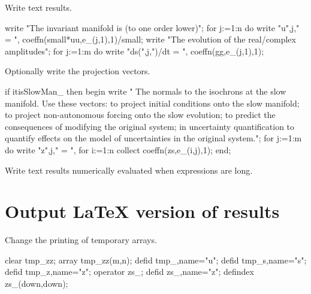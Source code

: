 \documentclass[11pt,a5paper]{article}
\begin{document}
Write text results.
\begin{reduce}
write "The invariant manifold is (to one order lower)";
for j:=1:n do write "u",j," = ",
  coeffn(small*uu,e_(j,1),1)/small;
write "The evolution of the real/complex amplitudes";
for j:=1:m do write "ds(",j,")/dt = ",
  coeffn(gg,e_(j,1),1);
\end{reduce}

Optionally write the projection vectors.
\begin{reduce}
if itisSlowMan_ then begin write "
The normals to the isochrons at the slow manifold.
Use these vectors: to project initial conditions
onto the slow manifold; to project non-autonomous
forcing onto the slow evolution; to predict the
consequences of modifying the original system; in
uncertainty quantification to quantify effects on
the model of uncertainties in the original system.";
  for j:=1:m do write "z",j," = ",
    for i:=1:n collect coeffn(zs,e_(i,j),1);
end;
\end{reduce}

Write text results numerically evaluated when expressions
are long.





\section{Output LaTeX version of results}
Change the printing of temporary arrays.
\begin{reduce}
clear tmp_zz; array tmp_zz(m,n);
defid tmp_,name="u";
defid tmp_s,name="\dot s";
defid tmp_z,name="\vec z";
operator zs_;%
defid zs_,name="z";
defindex zs_(down,down);
\end{reduce}
\end{document}
